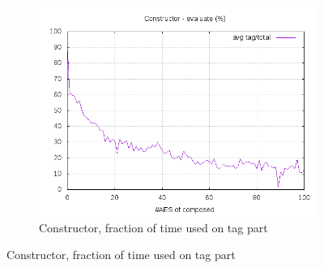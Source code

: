 \documentclass[10pt,a4paper]{article}
\begin{document}
\begin{figure}[h]
\begin{subfigure}[t]{0.3\textwidth}
        \includegraphics[width=\textwidth]{const_eval_frac}
        \caption{Constructor, fraction of time used on tag part}
    \end{subfigure}


\end{figure}
\end{document}
